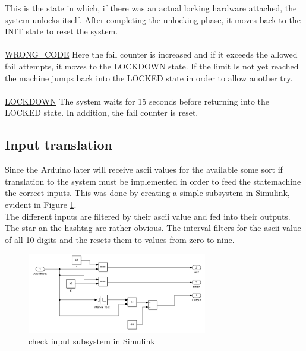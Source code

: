 		This is the state in which, if there was an actual locking hardware attached, the system unlocks itself. After completing the unlocking phase, it moves back to the INIT state to reset the system.
		\\~\\
		\underline{WRONG\_CODE} \newline
		Here the fail counter is increased and if it exceeds the allowed fail attempts, it moves to the LOCKDOWN state. If the limit Is not yet reached the machine jumps back into the LOCKED state in order to allow another try. 
		\\~\\
		\underline{LOCKDOWN} \newline
		The system waits for 15 seconds before returning into the LOCKED state. In addition, the fail counter is reset.
		
		\subsection{Input translation}
		Since the Arduino later will receive ascii values for the available some sort if translation to the system must be implemented in order to feed the statemachine the correct inputs. This was done by creating a simple subsystem in Simulink, evident in Figure \ref{fig:check}.\\
		The different inputs are filtered by their ascii value and fed into their outputs. The star an the hashtag are rather obvious. The interval filters for the ascii value of all 10 digits and the resets them to values from zero to nine. 
			\begin{figure}[H]
					\centering
					\includegraphics[width=0.7\textwidth]{figures/check_input.png}
					\caption{check input subsystem in Simulink}
					\label{fig:check}
			\end{figure}
		
		
